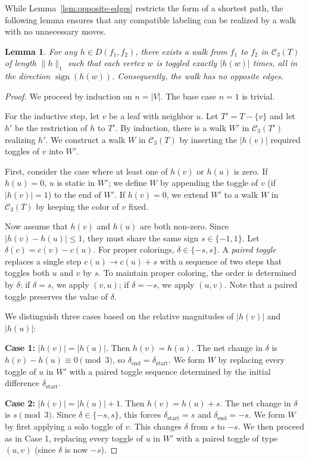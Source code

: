 \documentclass[12pt,reqno]{amsart}
\newtheorem{lem}[thm]{Lemma}
\theoremstyle{definition}
\newcommand{\C}{\mathcal{C}}
\begin{document}
While Lemma~\ref{lem:opposite-edges} restricts the form of a shortest path, the following lemma ensures that any compatible labeling can be realized by a walk with no unnecessary moves.

\begin{lem}\label{lem:path-norm}
For any $h\in D(f_1,f_2)$, there exists a walk from $f_1$ to $f_2$ in $\C_3(T)$ of length $\|h\|_1$ such that each vertex $w$ is toggled exactly $|h(w)|$ times, all in the direction $\operatorname{sign}(h(w))$. Consequently, the walk has no opposite edges.
\end{lem}

\begin{proof}
We proceed by induction on $n=|V|$. The base case $n=1$ is trivial.

For the inductive step, let $v$ be a leaf with neighbor $u$. Let $T'=T-\{v\}$ and let $h'$ be the restriction of $h$ to $T'$. By induction, there is a walk $W'$ in $\C_3(T')$ realizing $h'$. We construct a walk $W$ in $\C_3(T)$ by inserting the $|h(v)|$ required toggles of $v$ into $W'$.

First, consider the case where at least one of $h(v)$ or $h(u)$ is zero. If $h(u)=0$, $u$ is static in $W'$; we define $W$ by appending the toggle of $v$ (if $|h(v)|=1$) to the end of $W'$. If $h(v)=0$, we extend $W'$ to a walk $W$ in $\C_3(T)$ by keeping the color of $v$ fixed. 

Now assume that $h(v)$ and $h(u)$ are both non-zero. Since $|h(v)-h(u)|\le 1$, they must share the same sign $s \in \{-1, 1\}$. Let $\delta(c) = c(v)-c(u)$. For proper colorings, $\delta \in \{-s, s\}$. A \emph{paired toggle} replaces a single step $c(u) \to c(u)+s$ with a sequence of two steps that toggles both $u$ and $v$ by $s$. To maintain proper coloring, the order is determined by $\delta$: if $\delta=s$, we apply $(v, u)$; if $\delta=-s$, we apply $(u, v)$. Note that a paired toggle preserves the value of $\delta$.

We distinguish three cases based on the relative magnitudes of $|h(v)|$ and $|h(u)|$:

\textbf{Case 1:} $|h(v)|=|h(u)|$. Then $h(v)=h(u)$. The net change in $\delta$ is $h(v)-h(u) \equiv 0 \pmod{3}$, so $\delta_{\text{end}}=\delta_{\text{start}}$. We form $W$ by replacing every toggle of $u$ in $W'$ with a paired toggle sequence determined by the initial difference $\delta_{\text{start}}$.

\textbf{Case 2:} $|h(v)|=|h(u)|+1$. Then $h(v)=h(u)+s$. The net change in $\delta$ is $s \pmod{3}$. Since $\delta \in \{-s, s\}$, this forces $\delta_{\text{start}}=s$ and $\delta_{\text{end}}=-s$. We form $W$ by first applying a solo toggle of $v$. This changes $\delta$ from $s$ to $-s$. We then proceed as in Case 1, replacing every toggle of $u$ in $W'$ with a paired toggle of type $(u, v)$ (since $\delta$ is now $-s$).


\end{proof}
\end{document}
